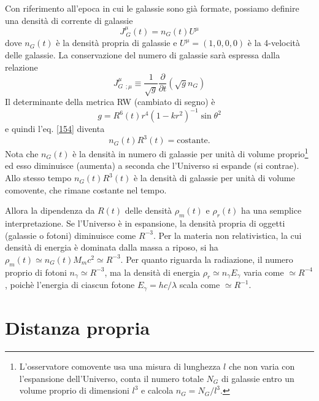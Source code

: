 Con riferimento all'epoca in cui le galassie sono già formate, possiamo definire
una densità di corrente di galassie
\begin{equation}
  J^{\mu}_{~G}(t) = n_G(t) U^{\mu}
  \label{154}
\end{equation}
dove $n_G(t)$ è la densità propria di galassie e $U^{\mu}=(1,0,0,0)$ è la
4-velocità delle galassie.  La conservazione del numero di galassie sarà
espressa dalla relazione
\begin{equation}
  J^{\mu}_{G~~;\mu} \equiv \frac{1}{\sqrt{g}} \frac{\partial}{\partial t}
  (\sqrt{g} n_G)
\end{equation}
Il determinante della metrica RW (cambiato di segno) è
\begin{equation}
  g=R^6(t) r^4 (1-kr^2)^{-1} \sin \theta ^2
\end{equation}
e quindi l'eq. \eqref{154} diventa
\begin{equation}
  n_G(t) R^3(t) = \text{costante}.
\end{equation}
Nota che $n_G(t)$ è la densità in numero di galassie per unità di volume
proprio\footnote{L'osservatore comovente usa una misura di lunghezza $l$ che non
  varia con l'espansione dell'Universo, conta il numero totale $N_G$ di galassie
  entro un volume proprio di dimensioni $l^3$ e calcola $n_G = N_G/l^3$.}  ed
esso diminuisce (aumenta) a seconda che l'Universo si espande (si contrae).
Allo stesso tempo $n_G(t) R^3(t)$ è la densità di galassie per unità di volume
comovente, che rimane costante nel tempo.

Allora la dipendenza da $R(t)$ delle densità $\rho_m(t)$ e $\rho_r(t)$ ha una
semplice interpretazione.  Se l'Universo è in espansione, la densità propria di
oggetti (galassie o fotoni) diminuisce come $R^{-3}$.  Per la materia non
relativistica, la cui densità di energia è dominata dalla massa a riposo, si ha
$\rho_m (t) \simeq n_G (t) M_m c^2 \simeq R^{-3}$.  Per quanto riguarda la
radiazione, il numero proprio di fotoni $n_{\gamma} \simeq R^{-3}$, ma la
densità di energia $\rho_r \simeq n_{\gamma} E_{\gamma}$ varia come $\simeq
R^{-4}$, poichè l'energia di ciascun fotone $E_{\gamma} = hc/\lambda$ scala come
$\simeq R^{-1}$.

\section{Distanza propria}

